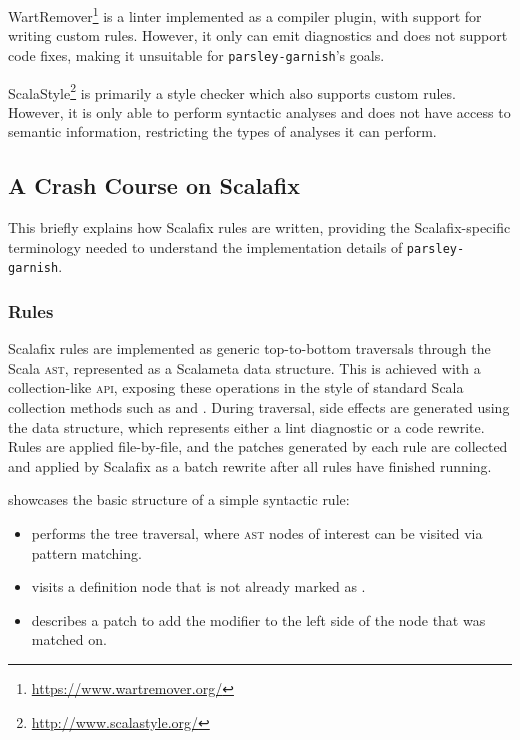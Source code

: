 \documentclass[../../main.tex]{subfiles}
\begin{document}
WartRemover\footnote{\url{https://www.wartremover.org/}} is a linter implemented as a compiler plugin, with support for writing custom rules.
However, it only can emit diagnostics and does not support code fixes, making it unsuitable for \texttt{parsley-garnish}'s goals.

ScalaStyle\footnote{\url{http://www.scalastyle.org/}} is primarily a style checker which also supports custom rules.
However, it is only able to perform syntactic analyses and does not have access to semantic information, restricting the types of analyses it can perform.


\subsection{A Crash Course on Scalafix}\label{sec:scalafix}
This  briefly explains how Scalafix rules are written,
providing the Scalafix-specific terminology needed to understand the implementation details of \texttt{parsley-garnish}.

\subsubsection{Rules}
Scalafix rules are implemented as generic top-to-bottom traversals through the Scala \textsc{ast}, represented as a Scalameta  data structure.
This is achieved with a collection-like \textsc{api}, exposing these operations in the style of standard Scala collection methods such as  and .
During traversal, side effects are generated using the  data structure, which represents either a lint diagnostic or a code rewrite.
Rules are applied file-by-file, and the patches generated by each rule are collected and applied by Scalafix as a batch rewrite after all rules have finished running.

 showcases the basic structure of a simple syntactic rule:
\begin{itemize}
  \item {} performs the tree traversal, where \textsc{ast} nodes of interest can be visited via pattern matching.
  \item {} visits a  definition node that is not already marked as .
  \item {} describes a patch to add the  modifier to the left side of the node that was matched on.
\end{itemize}
\end{document}
